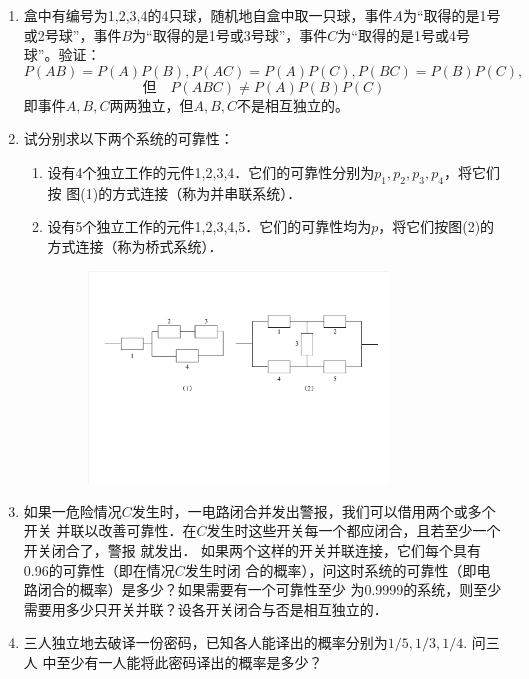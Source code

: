\documentclass[10pt,a4paper]{article}
\begin{document}
\begin{enumerate}
    \item 盒中有编号为1,2,3,4的4只球，随机地自盒中取一只球，事件$A$为“取得的是1号
    或2号球”，事件$B$为“取得的是1号或3号球”，事件$C$为“取得的是1号或4号球”。验证：
    $$P(AB)=P(A)P(B),P(AC)=P(A)P(C),P(BC)=P(B)P(C),$$
    $$\mbox{但}\quad P(ABC)\neq P(A)P(B)P(C)$$
    即事件$A,B,C$两两独立，但$A,B,C$不是相互独立的。


    \item 试分别求以下两个系统的可靠性：
    \begin{enumerate}
        \item 设有4个独立工作的元件1,2,3,4．它们的可靠性分别为$p_1,p_2,p_3,p_4$，将它们按
        图(1)的方式连接（称为并串联系统）．
        \item 设有5个独立工作的元件1,2,3,4,5．它们的可靠性均为$p$，将它们按图(2)的
        方式连接（称为桥式系统）．
        \begin{figure}[H]
        \centering
        \includegraphics[width=0.8\textwidth]{1.34.pdf}
        \end{figure}
        \vspace{-0.5cm}
    \end{enumerate}



    \item 如果一危险情况$C$发生时，一电路闭合并发出警报，我们可以借用两个或多个开关
    并联以改善可靠性．在$C$发生时这些开关每一个都应闭合，且若至少一个开关闭合了，警报
    就发出． 如果两个这样的开关并联连接，它们每个具有0.96的可靠性（即在情况$C$发生时闭
    合的概率），问这时系统的可靠性（即电路闭合的概率）是多少？如果需要有一个可靠性至少
    为0.9999的系统，则至少需要用多少只开关并联？设各开关闭合与否是相互独立的．


    \item 三人独立地去破译一份密码，已知各人能译出的概率分别为$1/5,1/3,1/4$. 问三人
    中至少有一人能将此密码译出的概率是多少？



\end{enumerate}
\end{document}
